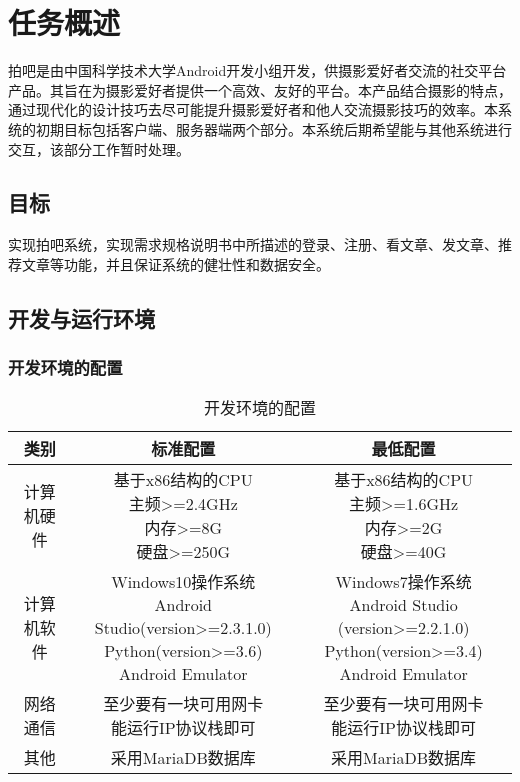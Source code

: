 \chapter{任务概述}
拍吧是由中国科学技术大学Android开发小组开发，供摄影爱好者交流的社交平台产品。其旨在为摄影爱好者提供一个高效、友好的平台。本产品结合摄影的特点，通过现代化的设计技巧去尽可能提升摄影爱好者和他人交流摄影技巧的效率。本系统的初期目标包括客户端、服务器端两个部分。本系统后期希望能与其他系统进行交互，该部分工作暂时处理。

\section{目标}
实现拍吧系统，实现需求规格说明书中所描述的登录、注册、看文章、发文章、推荐文章等功能，并且保证系统的健壮性和数据安全。

\section{开发与运行环境}

\subsection{开发环境的配置}
\begin{table}[htbp]
\centering
\caption{开发环境的配置} \label{tab:development-environment}
\begin{tabular}{|c|c|c|}
    \hline
    类别 & 标准配置 & 最低配置 \\
    \hline
    计算机硬件 & \tabincell{c}{基于x86结构的CPU\\ 主频>=2.4GHz\\ 内存>=8G\\ 硬盘>=250G} & \tabincell{c}{基于x86结构的CPU\\ 主频>=1.6GHz\\ 内存>=2G\\ 硬盘>=40G} \\
    \hline
    计算机软件 & \tabincell{c}{Windows10操作系统\\Android Studio(version>=2.3.1.0)\\Python(version>=3.6)\\Android Emulator} & \tabincell{c}{Windows7操作系统\\Android Studio (version>=2.2.1.0)\\Python(version>=3.4)\\Android Emulator}\\ 
    \hline
    网络通信 & \tabincell{c}{至少要有一块可用网卡\\ 能运行IP协议栈即可} & \tabincell{c}{至少要有一块可用网卡\\ 能运行IP协议栈即可} \\
    \hline
    其他 & 采用MariaDB数据库 & 采用MariaDB数据库 \\
    \hline
\end{tabular}
\end{table}

